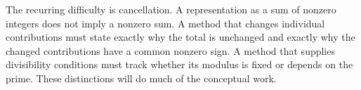 The recurring difficulty is cancellation. A representation as a sum of nonzero integers does not imply a nonzero sum. A method that changes individual contributions must state exactly why the total is unchanged and exactly why the changed contributions have a common nonzero sign. A method that supplies divisibility conditions must track whether its modulus is fixed or depends on the prime. These distinctions will do much of the conceptual work.

